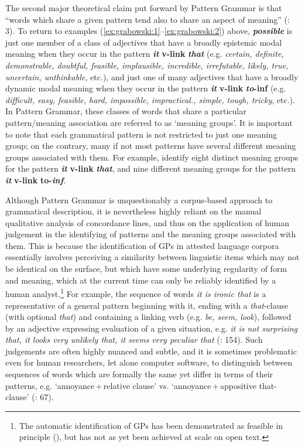 \documentclass[output=paper]{langscibook}
\begin{document}
The second major theoretical claim put forward by Pattern Grammar is that “words which share a given pattern tend also to share an aspect of meaning” (\citealt{HunstonFrancis2000}: 3). To return to examples (\ref{ex:grabowski:1}--\ref{ex:grabowski:2}) above, \textbf{\textit{possible}} is just one member of a class of adjectives that have a broadly epistemic modal meaning when they occur in the pattern \textbf{\textit{it}} \textbf{v-link} \textbf{{\ADJ}} \textbf{\textit{that}} (e.g. \textit{certain, definite, demonstrable, doubtful, feasible, implausible, incredible, irrefutable, likely, true, uncertain, unthinkable,} etc.), and just one of many adjectives that have a broadly dynamic modal meaning when they occur in the pattern \textbf{\textit{it}} \textbf{v-link} \textbf{{\ADJ}} \textbf{\textit{to}}\textbf{{}-inf} (e.g. \textit{difficult, easy, feasible, hard, impossible, impractical., simple, tough, tricky}, etc.). In Pattern Grammar, these classes of words that share a particular pattern/meaning association are referred to as ‘meaning groups’. It is important to note that each grammatical pattern is not restricted to just one meaning group; on the contrary, many if not most patterns have several different meaning groups associated with them. For example, \citet{FrancisEtAl1998} identify eight distinct meaning groups for the pattern \textbf{\textit{it}} \textbf{v-link} \textbf{{\ADJ}} \textbf{\textit{that}}, and nine different meaning groups for the pattern \textbf{\textit{it}} \textbf{v-link} \textbf{{\ADJ}} \textbf{to-\textit{inf}}.

Although Pattern Grammar is unquestionably a corpus-based approach to grammatical description, it is nevertheless highly reliant on the manual qualitative analysis of concordance lines, and thus on the application of human judgement in the identifying of patterns and the meaning groups associated with them. This is because the identification of GPs in attested language corpora essentially involves perceiving a similarity between linguistic items which may not be identical on the surface, but which have some underlying regularity of form and meaning, which at the current time can only be reliably identified by a human analyst.\footnote{The automatic identification of GPs has been demonstrated as feasible in principle (\citealt{MasonHunston2004}), \textrm{but has not as yet been achieved at scale on open text.}} For example, the sequence of words \textit{it is ironic that} is a representative of a general pattern beginning with it, ending with a \textit{that}{}-clause (with optional \textit{that}) and containing a linking verb (e.g. \textit{be, seem, look}), followed by an adjective expressing evaluation of a given situation, e.g. \textit{it is not surprising that, it looks very unlikely that, it seems very peculiar that} (\citealt{HunstonFrancis2000}: 154). Such judgements are often highly nuanced and subtle, and it is sometimes problematic even for human researchers, let alone computer software, to distinguish between sequences of words which are formally the same yet differ in terms of their patterns, e.g. ‘annoyance\,+\,relative clause’ vs. ‘annoyance\,+\,appositive that-clause’ (\citealt{HunstonFrancis2000}: 67). 
\end{document}
